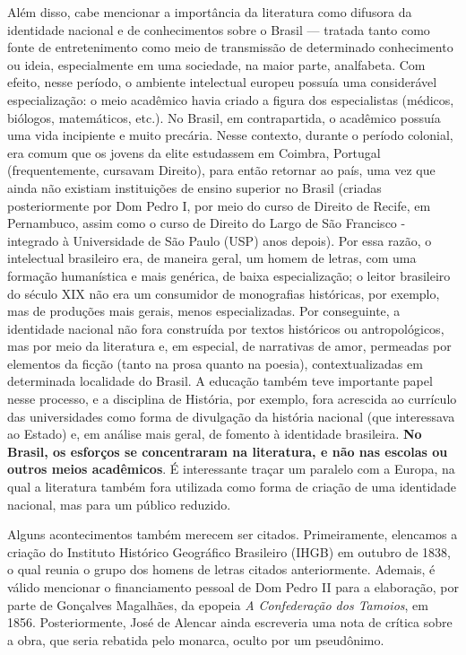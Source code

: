 Além disso, cabe mencionar a importância da literatura como difusora da identidade nacional e de conhecimentos sobre o Brasil — tratada tanto como fonte de entretenimento como meio de transmissão de determinado conhecimento ou ideia, especialmente em uma sociedade, na maior parte, analfabeta. Com efeito, nesse período, o ambiente intelectual europeu possuía uma considerável especialização: o meio acadêmico havia criado a figura dos especialistas (médicos, biólogos, matemáticos, etc.). No Brasil, em contrapartida, o acadêmico possuía uma vida incipiente e muito precária. Nesse contexto, durante o período colonial, era comum que os jovens da elite estudassem em Coimbra, Portugal (frequentemente, cursavam Direito), para então retornar ao país, uma vez que ainda não existiam instituições de ensino superior no Brasil (criadas posteriormente por Dom Pedro I, por meio do curso de Direito de Recife, em Pernambuco, assim como o curso de Direito do Largo de São Francisco - integrado à Universidade de São Paulo (USP) anos depois). Por essa razão, o intelectual brasileiro era, de maneira geral, um homem de letras, com uma formação humanística e mais genérica, de baixa especialização; o leitor brasileiro do século XIX não era um consumidor de monografias históricas, por exemplo, mas de produções mais gerais, menos especializadas. Por conseguinte, a identidade nacional não fora construída por textos históricos ou antropológicos, mas por meio da literatura e, em especial, de narrativas de amor, permeadas por elementos da ficção (tanto na prosa quanto na poesia), contextualizadas em determinada localidade do Brasil. A educação também teve importante papel nesse processo, e a disciplina de História, por exemplo, fora acrescida ao currículo das universidades como forma de divulgação da história nacional (que interessava ao Estado) e, em análise mais geral, de fomento à identidade brasileira. \textbf{No Brasil, os esforços se concentraram na literatura, e não nas escolas ou outros meios acadêmicos}. É interessante traçar um paralelo com a Europa, na qual a literatura também fora utilizada como forma de criação de uma identidade nacional, mas para um público reduzido.

Alguns acontecimentos também merecem ser citados. Primeiramente, elencamos a criação do Instituto Histórico Geográfico Brasileiro (IHGB) em outubro de 1838, o qual reunia o grupo dos homens de letras citados anteriormente. Ademais, é válido mencionar o financiamento pessoal de Dom Pedro II para a elaboração, por parte de Gonçalves Magalhães, da epopeia \textit{A Confederação dos Tamoios}, em 1856. Posteriormente, José de Alencar ainda escreveria uma nota de crítica sobre a obra, que seria rebatida pelo monarca, oculto por um pseudônimo.


